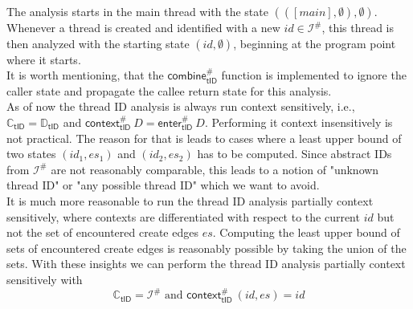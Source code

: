   The analysis starts in the main thread with the state $(([main], \emptyset), \emptyset)$. Whenever a thread is created and identified with a new $id \in \mathcal{I}^{\#}$, this thread is then analyzed with the starting state $(id, \emptyset)$, beginning at the program point where it starts.\\
  It is worth mentioning, that the $\textsf{combine}^{\#}_\textsf{tID}$ function is implemented to ignore the caller state and propagate the callee return state for this analysis.
  \\
  As of now the thread ID analysis is always run context sensitively, i.e., $\mathbb{C}_\textsf{tID} = \mathbb{D}_\textsf{tID}$ and $\textsf{context}^{\#}_\textsf{tID}\ D = \textsf{enter}^{\#}_\textsf{tID}\ D$. Performing it context insensitively is not practical. The reason for that is leads to cases where a least upper bound of two states $(id_1, es_1)$ and $(id_2, es_2)$ has to be computed. Since abstract IDs from $\mathcal{I}^{\#}$ are not reasonably comparable, this leads to a notion of "unknown thread ID" or "any possible thread ID" which we want to avoid.\\
  It is much more reasonable to run the thread ID analysis partially context sensitively, where contexts are differentiated with respect to the current $id$ but not the set of encountered create edges $es$. Computing the least upper bound of sets of encountered create edges is reasonably possible by taking the union of the sets. With these insights we can perform the thread ID analysis partially context sensitively with
  \[\mathbb{C}_\textsf{tID} = \mathcal{I}^{\#} \text{ and } \textsf{context}^{\#}_\textsf{tID}\ (id, es) = id\]
